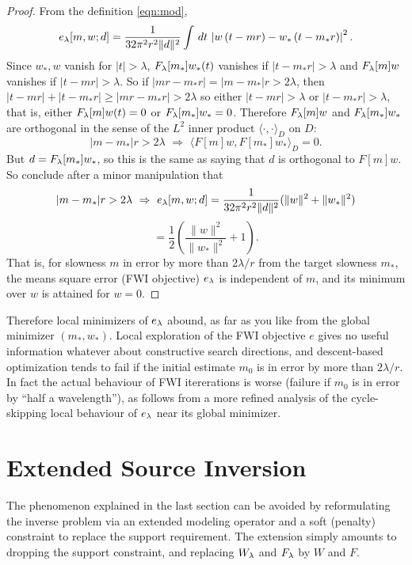 \begin{proof} From the definition \ref{eqn:mod},
\[
 e_{\lambda}[m,w;d] =  \frac{1}{32\pi^2
    r^2\|d\|^2}\int\,dt\,\left|w\left(t-mr\right)-w_*\left(t-m_*r\right)\right|^2.
\]
Since $w_*, w$ vanish for $|t|>\lambda$,
$F_{\lambda}[m_*]w_*(t)$ vanishes if $|t-m_*r|>\lambda$ and $F_{\lambda}[m]w$ vanishes if $|t-mr|>\lambda$. So if $|mr-m_*r|
= |m-m_*|r > 2\lambda$, then $|t-mr|+|t-m_*r| \ge |mr-m_*r| >
2\lambda$ so either $|t-mr|>\lambda$ or $|t-m_*r|>\lambda$, that is,
either $F_{\lambda}[m]w(t)=0$ or $F_{\lambda}[m_*]w_*=0$. Therefore $F_{\lambda}[m]w$ and
$F_{\lambda}[m_*]w_*$ are orthogonal in the sense of the $L^2$ inner product
$\langle \cdot,\cdot \rangle_D$ on $D$:
\begin{equation}
  \label{eqn:ortho}
  |m- m_*|r > 2\lambda \,\, \Rightarrow \,\, \langle F[m]w,
  F[m_*]w_*\rangle_D = 0.
\end{equation}
But $d = F_{\lambda}[m_*]w_*$, so this is the same as saying that $d$ is
orthogonal to $F[m]w$. So conclude after a minor manipulation that
\[
  |m- m_*|r > 2\lambda \,\, \Rightarrow \,\, e_{\lambda}[m,w;d]=\frac{1}{32\pi^2 
    r^2\|d\|^2}(\|w\|^2 + \|w_*\|^2)
\]
\begin{equation}
  \label{eqn:iso}
  = \frac{1}{2}\left(\frac{\|w\|^2}{\|w_*\|^2} + 1 \right).
\end{equation}
That is, for slowness $m$ in error by more than $2\lambda/r$ from the 
target slowness $m_*$, the means square error (FWI objective) $e_{\lambda}$ is independent of
$m$, and its minimum over $w$ is attained for $w=0$.
\end{proof}

Therefore local minimizers of $e_{\lambda}$ abound, as far as you like from the
global minimizer $(m_*,w_*)$. Local exploration of the FWI objective
$e$ gives no useful information whatever about constructive search
directions, and descent-based optimization tends to fail if the
initial estimate $m_0$ is in error by more than $2\lambda/r$. In fact the actual behaviour of FWI itererations is worse
(failure if $m_0$ is in error by ``half a wavelength''), as follows
from a more refined analysis of the cycle-skipping local behaviour of $e_{\lambda}$ near its
global minimizer.

\section{Extended Source Inversion}
The phenomenon explained in the last section can be avoided by
reformulating the inverse problem via an extended modeling operator
and a soft (penalty) constraint to replace the support
requirement. The extension simply amounts to dropping the support
constraint, and replacing $W_{\lambda}$ and $F_{\lambda}$ by $W$ and $F$.

